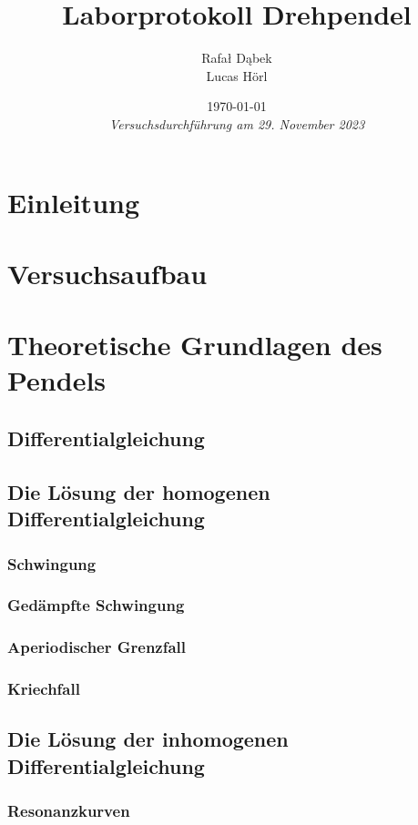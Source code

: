 \documentclass{article}
\title{\textbf{Laborprotokoll Drehpendel}}
\author{
    Rafał Dąbek \\
    Lucas Hörl
}
\date{
    \today \\
    \textit{Versuchsdurchführung am 29. November 2023}
}
\begin{document}
\maketitle
\clearpage

\tableofcontents
\clearpage

\section{Einleitung}
\clearpage

\section{Versuchsaufbau}
\clearpage

\section{Theoretische Grundlagen des Pendels}
\subsection{Differentialgleichung}
\cite{texbook}
\subsection{Die Lösung der homogenen Differentialgleichung}
\subsubsection{Schwingung}
\subsubsection{Gedämpfte Schwingung}
\subsubsection{Aperiodischer Grenzfall}
\subsubsection{Kriechfall}
\subsection{Die Lösung der inhomogenen Differentialgleichung}
\subsubsection{Resonanzkurven}
\end{document}
